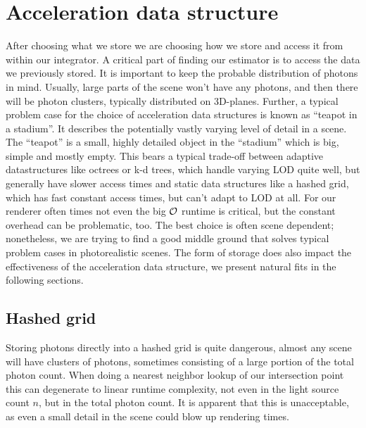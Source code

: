 \section{Acceleration data structure}
\label{ch:AccelDat}

After choosing what we store we are choosing how we store and access it from within our integrator. A critical part of finding our estimator is to access the data we previously stored. It is important to keep the probable distribution of photons in mind. Usually, large parts of the scene won't have any photons, and then there will be photon clusters, typically distributed on 3D-planes. Further, a typical problem case for the choice of acceleration data structures is known as \enquote{teapot in a stadium}. It describes the potentially vastly varying level of detail in a scene. The \enquote{teapot} is a small, highly detailed object in the \enquote{stadium} which is big, simple and mostly empty. This bears a typical trade-off between adaptive datastructures like octrees or k-d trees, which handle varying LOD quite well, but generally have slower access times and static data structures like a hashed grid, which has fast constant access times, but can't adapt to LOD at all. For our renderer often times not even the big $\mathcal{O}$ runtime is critical, but the constant overhead can be problematic, too. The best choice is often scene dependent; nonetheless, we are trying to find a good middle ground that solves typical problem cases in photorealistic scenes. The form of storage does also impact the effectiveness of the acceleration data structure, we present natural fits in the following sections.

\subsection{Hashed grid}
\label{ch:pnee:hashedgrid}
Storing photons directly into a hashed grid is quite dangerous, almost any scene will have clusters of photons, sometimes consisting of a large portion of the total photon count. When doing a nearest neighbor lookup of our intersection point this can degenerate to linear runtime complexity, not even in the light source count $n$, but in the total photon count. It is apparent that this is unacceptable, as even a small detail in the scene could blow up rendering times.

